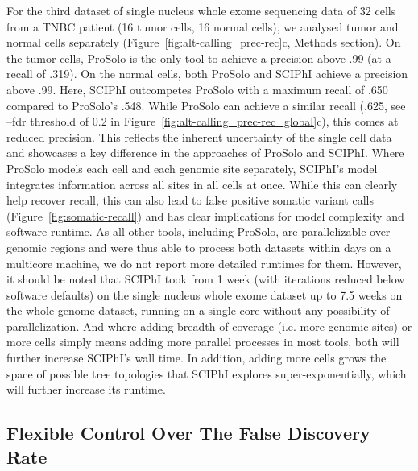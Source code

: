 \documentclass[12pt,inline]{wlscirep}
\begin{document}
For the third dataset of single nucleus whole exome sequencing data of 32 cells from a TNBC patient (16 tumor cells, 16 normal cells), we analysed tumor and normal cells separately (Figure~\ref{fig:alt-calling_prec-rec}c, Methods section).
On the tumor cells, ProSolo is the only tool to achieve a precision above .99 (at a recall of .319).
On the normal cells, both ProSolo and SCIPhI achieve a precision above .99.
Here, SCIPhI outcompetes ProSolo with a maximum recall of .650 compared to ProSolo's .548.
While ProSolo can achieve a similar recall (.625, see {\ttfamily --fdr} threshold of 0.2 in Figure~\ref{fig:alt-calling_prec-rec_global}c), this comes at reduced precision.
This reflects the inherent uncertainty of the single cell data and showcases a key difference in the approaches of ProSolo and SCIPhI.
Where ProSolo models each cell and each genomic site separately, SCIPhI's model integrates information across all sites in all cells at once.
While this can clearly help recover recall, this can also lead to false positive somatic variant calls (Figure~\ref{fig:somatic-recall}) and has clear implications for model complexity and software runtime.
As all other tools, including ProSolo, are parallelizable over genomic regions and were thus able to process both datasets within days on a multicore machine, we do not report more detailed runtimes for them.
However, it should be noted that SCIPhI took from 1 week (with iterations reduced below software defaults) on the single nucleus whole exome dataset up to 7.5 weeks on the whole genome dataset, running on a single core without any possibility of parallelization.
And where adding breadth of coverage (i.e. more genomic sites) or more cells simply means adding more parallel processes in most tools, both will further increase SCIPhI's wall time.
In addition, adding more cells grows the space of possible tree topologies that SCIPhI explores super-exponentially\cite{lahnemann_eleven_2020}, which will further increase its runtime.

\subsection*{Flexible Control Over The False Discovery Rate}
\end{document}
